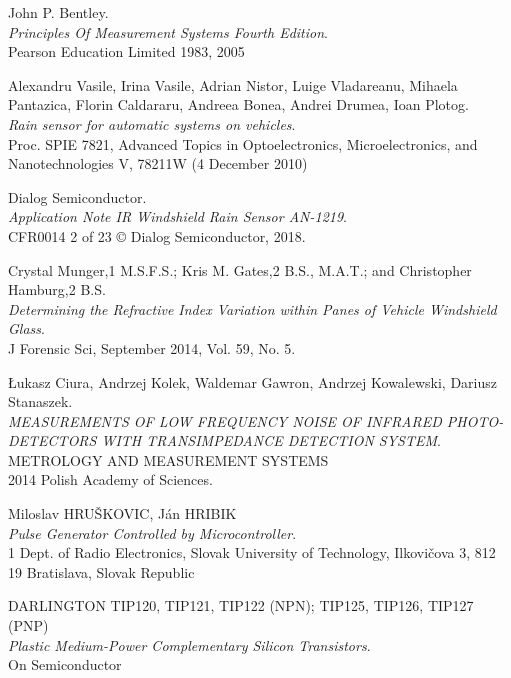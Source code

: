 \documentclass[conference, 11pt]{IEEEtran}
\begin{document}
\begin{thebibliography}{22}


John P. Bentley. \\
\textit{Principles Of Measurement Systems Fourth Edition}. \\
Pearson Education Limited 1983, 2005



Alexandru Vasile, Irina Vasile, Adrian Nistor, Luige Vladareanu, Mihaela Pantazica, Florin Caldararu, Andreea Bonea, Andrei Drumea, Ioan Plotog.\\
\textit{Rain sensor for automatic systems on vehicles}. \\
Proc. SPIE 7821, Advanced Topics in Optoelectronics, Microelectronics, and Nanotechnologies V, 78211W (4 December 2010)

Dialog Semiconductor. \\
\textit{Application Note IR Windshield Rain Sensor AN-1219}. \\
CFR0014 2 of 23 © Dialog Semiconductor, 2018.


Crystal Munger,1 M.S.F.S.; Kris M. Gates,2 B.S., M.A.T.; and Christopher Hamburg,2 B.S. \\
\textit{Determining the Refractive Index Variation within Panes of Vehicle Windshield Glass}. \\
J Forensic Sci, September 2014, Vol. 59, No. 5.



Łukasz Ciura, Andrzej Kolek, Waldemar Gawron, Andrzej Kowalewski, Dariusz Stanaszek.\\
\textit{MEASUREMENTS OF LOW FREQUENCY NOISE OF INFRARED PHOTO- DETECTORS WITH TRANSIMPEDANCE DETECTION SYSTEM}. \\
METROLOGY AND MEASUREMENT SYSTEMS\\
2014 Polish Academy of Sciences.



Miloslav HRUŠKOVIC, Ján HRIBIK \\
\textit{Pulse Generator Controlled by Microcontroller}. \\
1 Dept. of Radio Electronics, Slovak University of Technology, Ilkovičova 3, 812 19 Bratislava, Slovak Republic


DARLINGTON TIP120, TIP121, TIP122 (NPN); TIP125, TIP126, TIP127 (PNP)\\
\textit{Plastic Medium-Power Complementary Silicon Transistors}. \\
On Semiconductor



\end{thebibliography}
\end{document}
